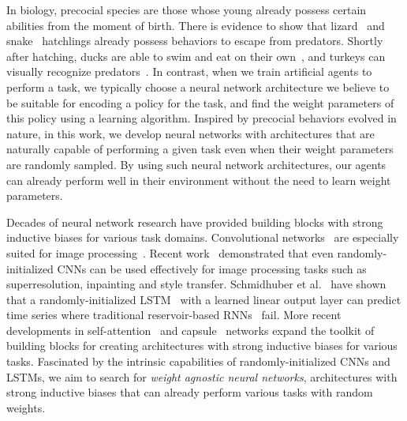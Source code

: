 
In biology, precocial species are those whose young already possess certain abilities from the moment of birth. There is evidence to show that lizard~\cite{miles1995morphological} and snake~\cite{burger1998antipredator,mori2000does} hatchlings already possess behaviors to escape from predators. Shortly after hatching, ducks are able to swim and eat on their own~\cite{starck1998patterns}, and turkeys can visually recognize predators~\cite{goth2001innate}. In contrast, when we train artificial agents to perform a task, we typically choose a neural network architecture we believe to be suitable for encoding a policy for the task, and find the weight parameters of this policy using a learning algorithm.
%
Inspired by precocial behaviors evolved in nature, in this work, we develop neural networks with architectures that are naturally capable of performing a given task even when their weight parameters are randomly sampled.
%
By using such neural network architectures, our agents can already perform well in their environment without the need to learn weight parameters.



Decades of neural network research have provided building blocks with strong inductive biases for various task domains. Convolutional networks~\cite{lecun1995convolutional,fukushima1982neocognitron} are especially suited for image processing~\cite{cohen2016inductive}. Recent work~\cite{he2016powerful,ulyanov2018deep} demonstrated that even randomly-initialized CNNs can be used effectively for image processing tasks such as superresolution, inpainting and style transfer. Schmidhuber et al.~\cite{evolino} have shown that a randomly-initialized LSTM~\cite{lstm} with a learned linear output layer can predict time series where traditional reservoir-based RNNs~\cite{jaeger2004harnessing,reservoir} fail. More recent developments in self-attention~\cite{vaswani2017attention} and capsule~\cite{sabour2017dynamic} networks expand the toolkit of building blocks for creating architectures with strong inductive biases for various tasks. Fascinated by the intrinsic capabilities of randomly-initialized CNNs and LSTMs, we aim to search for \textit{weight agnostic neural networks}, architectures with strong inductive biases that can already perform various tasks with random weights.

